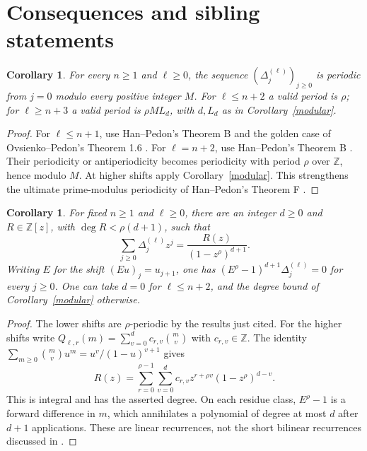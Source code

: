 \documentclass[11pt,a4paper]{article}
\newcommand{\Z}{\mathbb Z}
\newcommand{\D}[2]{\Delta_{#1}^{(#2)}}
\newtheorem{corollary}[theorem]{Corollary}
\begin{document}
\section{Consequences and sibling statements}
\begin{corollary}\label{allshifts}
For every $n\ge1$ and $\ell\ge0$, the sequence $(\D j\ell)_{j\ge0}$
is periodic from $j=0$ modulo every positive integer $M$.
For $\ell\le n+2$ a valid period is $\rho$; for $\ell\ge n+3$ a valid
period is $\rho M L_d$, with $d,L_d$ as in Corollary~\ref{modular}.
\end{corollary}
\begin{proof}
For $\ell\le n+1$, use Han--Pedon's Theorem B \cite{HP} and the
golden case of Ovsienko--Pedon's Theorem 1.6 \cite{OP}. For $\ell=n+2$,
use Han--Pedon's Theorem B \cite{HPplus}. Their periodicity or
antiperiodicity becomes periodicity with period $\rho$ over $\Z$, hence
modulo $M$. At higher shifts apply Corollary~\ref{modular}.
This strengthens the ultimate prime-modulus periodicity of
Han--Pedon's Theorem F \cite[p.~9]{HP}.
\end{proof}

\begin{corollary}\label{rational}
For fixed $n\ge1$ and $\ell\ge0$, there are an integer $d\ge0$ and
$R\in\Z[z]$, with $\deg R<\rho(d+1)$, such that
\[
 \sum_{j\ge0}\D j\ell z^j=\frac{R(z)}{(1-z^\rho)^{d+1}}.
\]
Writing $E$ for the shift $(Eu)_j=u_{j+1}$, one has
$(E^\rho-1)^{d+1}\D j\ell=0$ for every $j\ge0$.
One can take $d=0$ for $\ell\le n+2$, and the degree bound of
Corollary~\ref{modular} otherwise.
\end{corollary}
\begin{proof}
The lower shifts are $\rho$-periodic by the results just cited.
For the higher shifts write $Q_{\ell,r}(m)=\sum_{v=0}^d c_{r,v}\binom mv$
with $c_{r,v}\in\Z$. The identity
$\sum_{m\ge0}\binom mv u^m=u^v/(1-u)^{v+1}$ gives
\[
 R(z)=\sum_{r=0}^{\rho-1}\sum_{v=0}^d
 c_{r,v}z^{r+\rho v}(1-z^\rho)^{d-v}.
\]
This is integral and has the asserted degree. On each residue class,
$E^\rho-1$ is a forward difference in $m$, which annihilates a polynomial
of degree at most $d$ after $d+1$ applications. These are linear
recurrences, not the short bilinear recurrences discussed in \cite{HPplus}.
\end{proof}
\end{document}
